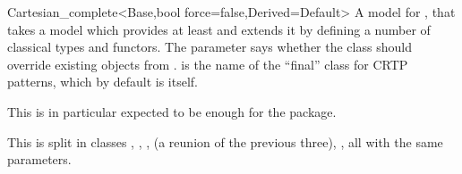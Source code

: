 \begin{ccRefClass}{Cartesian_complete<Base,bool force=false,Derived=Default>}
\ccDefinition
A model for , that takes a  model 
which provides at least  and extends it by defining a number
of classical types and functors.  The  parameter says whether
the class should override existing objects from .
 is the name of the ``final'' class for CRTP patterns,
which by default is  itself.

This is in particular expected to be enough for the 
package.

\ccIsModel
{}

\ccImplementation
This is split in classes ,
,
, 
 (a reunion of the previous three), 
, all with the same parameters.

\end{ccRefClass}
